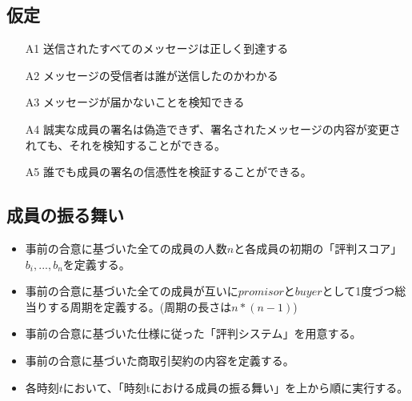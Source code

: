 \subsection{仮定}
\begin{itemize}
  \item[A1] 送信されたすべてのメッセージは正しく到達する
  \item[A2] メッセージの受信者は誰が送信したのかわかる
  \item[A3] メッセージが届かないことを検知できる
  \item[A4] 誠実な成員の署名は偽造できず、署名されたメッセージの内容が変更されても、それを検知することができる。
  \item[A5] 誰でも成員の署名の信憑性を検証することができる。
\end{itemize}

\subsection{成員の振る舞い}
  \begin{itemize}
    \item 事前の合意に基づいた全ての成員の人数$n$と各成員の初期の「評判スコア」$b_i, ..., b_n$を定義する。
    \item 事前の合意に基づいた全ての成員が互いに$promisor$と$buyer$として1度づつ総当りする周期を定義する。(周期の長さは$ n * (n-1)$)
    \item 事前の合意に基づいた仕様に従った「評判システム」を用意する。
    \item 事前の合意に基づいた商取引契約の内容を定義する。
    \item 各時刻$t$において、「時刻tにおける成員の振る舞い」を上から順に実行する。
  \end{itemize}

